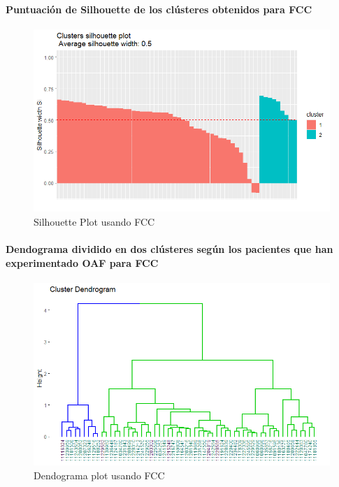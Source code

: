 \paragraph{Puntuación de Silhouette de los clústeres obtenidos para FCC}

\begin{figure}[H]
    \centering
    \includegraphics[scale = 0.8]{img/06-3-ccf.png}
    \caption{Silhouette Plot usando FCC}
    \label{fig:ccf_si}
\end{figure}

\paragraph{Dendograma dividido en dos clústeres según los pacientes que han experimentado OAF para FCC}

\begin{figure}[H]
    \centering
    \includegraphics[scale = 0.8]{img/06-4-ccf.png}
    \caption{Dendograma plot usando FCC}
    \label{fig:ccf_ctg}
\end{figure}

